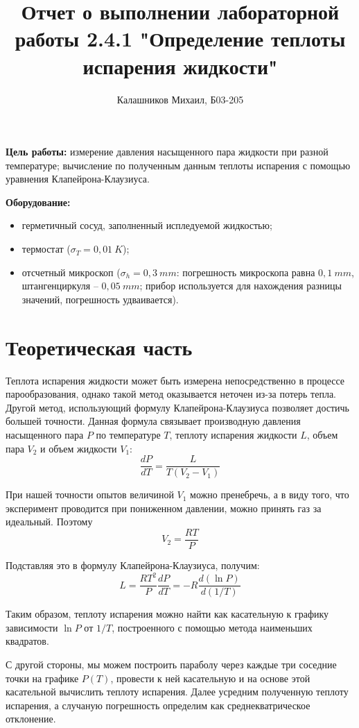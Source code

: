 \documentclass[14pt, a4paper]{report}
\title{\textbf{Отчет о выполнении лабораторной работы 2.4.1 "Определение теплоты испарения жидкости"}}
\author{Калашников Михаил, Б03-205}
\date{}
\begin{document}
\maketitle

\textbf{Цель работы:} измерение давления насыщенного пара жидкости при разной температуре; вычисление по полученным данным теплоты испарения с помощью уравнения Клапейрона-Клаузиуса.
\newline

\textbf{Оборудование:} 
\begin{itemize}
  \item герметичный сосуд, заполненный испледуемой жидкостью;
  \item термостат ($\sigma_T=0,01\ K$);
  \item  отсчетный микроскоп ($\sigma_h=0,3\ mm$: погрешность микроскопа равна $0,1\ mm$, штангенциркуля -- $0,05\ mm$; прибор используется для нахождения разницы значений, погрешность удваивается).
\end{itemize}

\section{Теоретическая часть}

Теплота испарения жидкости может быть измерена непосредственно в процессе парообразования, однако такой метод оказывается неточен из-за потерь тепла. Другой метод, использующий формулу Клапейрона-Клаузиуса позволяет достичь большей точности. Данная формула связывает производную давления насыщенного пара $P$ по температуре $T$, теплоту испарения жидкости $L$, объем пара $V_2$ и объем жидкости $V_1$:
\[\frac{dP}{dT}=\frac{L}{T(V_2-V_1)}\]

При нашей точности опытов величиной $V_1$ можно пренебречь, а в виду того, что эксперимент проводится при пониженном давлении, можно принять газ за идеальный. Поэтому
\[V_2=\frac{RT}{P}\]

Подставляя это в формулу Клапейрона-Клаузиуса, получим:
\[L=\frac{RT^{2}}{P}\frac{dP}{dT}=-R\frac{d\left(\ln P\right)}{d\left(1/T\right)}\]

Таким образом, теплоту испарения можно найти как касательную к графику зависимости $\ln P$ от $1/T$, построенного с помощью метода наименьших квадратов.

С другой стороны, мы можем построить параболу через каждые три соседние точки на графике $P(T)$, провести к ней касательную и на основе этой касательной вычислить теплоту испарения. Далее усредним полученную теплоту испарения, а случаную погрешность определим как среднекватрическое отклонение.
\end{document}
